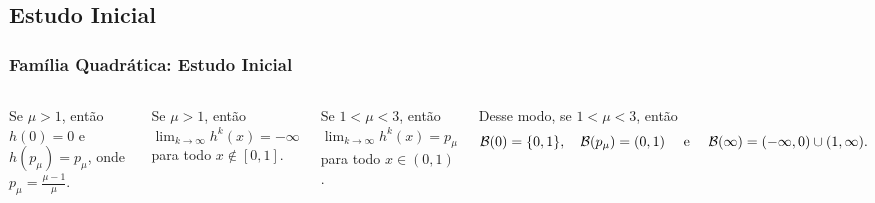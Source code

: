 \subsection{Estudo Inicial}

\begin{frame}
\vspace{5pt}
\frametitle{Família Quadrática: Estudo Inicial}
\begin{columns}
\column{\dimexpr\paperwidth-15pt}

\begin{proposition}
Se $\mu > 1$, então $h(0) = 0$ e $h(p_\mu) = p_\mu$, onde $p_\mu = \frac{\mu-1}{\mu}$.
\end{proposition}

\vspace{10pt}

\begin{proposition}
Se $\mu > 1$, então $\lim_{k \to \infty} h^k(x) = - \infty$ para todo $x \notin [0, 1]$.
\end{proposition}

\vspace{10pt}

\begin{proposition}
Se $1 < \mu < 3$, então $\lim_{k \to \infty} h^k(x) = p_\mu$ para todo $x \in (0, 1)$.
\end{proposition}

Desse modo, se $1 < \mu < 3$, então
$$\mathcal{B}(0) = \lbrace 0, 1 \rbrace, \quad \mathcal{B}(p_\mu) = (0, 1) \quad \text{ e } \quad \mathcal{B}(\infty) = (-\infty, 0) \cup (1, \infty).$$

\end{columns}
\end{frame}
